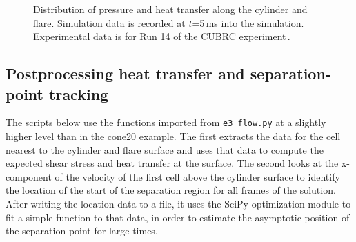 \begin{figure}[htbp]
 \centering
 \caption{Distribution of pressure and heat transfer along the cylinder and flare.
   Simulation data is recorded at $t$=5\,ms into the simulation.
   Experimental data is for Run 14 of the CUBRC experiment\,\cite{holden_etal_2002a}.}
 \label{fig:cylinder-flare-plate-data-compare}
\end{figure}

\bigskip
\subsection{Postprocessing heat transfer and separation-point tracking}
\label{cylinder-flare-post-processing}
%
The scripts below use the functions imported from \texttt{e3\_flow.py}
at a slightly higher level than in the cone20 example.
The first extracts the data for the cell nearest to the cylinder and flare surface
and uses that data to compute the expected shear stress and heat transfer at the surface.
The second looks at the x-component of the velocity of the first cell above the 
cylinder surface to identify the location of the start of the separation region
for all frames of the solution.
After writing the location data to a file, it uses the SciPy optimization module 
to fit a simple function to that data, 
in order to estimate the asymptotic position of the separation point for large times.

